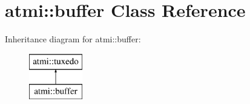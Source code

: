 \hypertarget{classatmi_1_1buffer}{\section{atmi\+:\+:buffer Class Reference}
\label{classatmi_1_1buffer}
}
Inheritance diagram for atmi\+:\+:buffer\+:\begin{figure}[H]
\begin{center}
\leavevmode
\includegraphics[height=2.000000cm]{classatmi_1_1buffer}
\end{center}
\end{figure}
